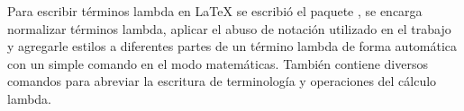 Para escribir términos lambda en \LaTeX{} se escribió el paquete \TeXLaMbDa, se encarga normalizar términos lambda, aplicar el abuso de notación utilizado en el trabajo y agregarle estilos a diferentes partes de un término lambda de forma automática con un simple comando en el modo matemáticas. También contiene diversos comandos para abreviar la escritura de terminología y operaciones del cálculo lambda.\\



